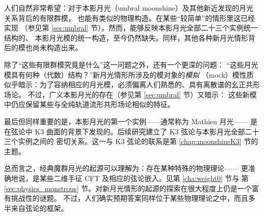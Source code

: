 
人们自然非常希望：对于本影月光（umbral moonshine）及其他新近发现的月光关系背后的有限群模，
也能有类似的物理构造。在某些“较简单”的情形里这已经实现
（参见第 \ref{sec:umbral} 节）。然而，能够反映本影月光全部二十三个实例统一结构的、
本影月光模的统一构造，至今仍然缺失。同样，其他各种新月光情形背后的模也尚未构造出来。


除了“这些有限群模究竟是什么”这一问题之外，还有一个更深的问题：
“这些月光模具有何种（代数）结构？”新月光情形所涉及的模对象的\emph{模拟}
（mock）模性质似乎暗示：为了容纳相应的月光模，必须偏离人们熟悉的、具有离散谱的幺正共形场论。
不过，广义本影月光的存在（参见第 \ref{sec:umbral} 节）又暗示：
这些新模中仍应保留某些与全纯轨道流形共形场论相似的特征。


最后但同样重要的是，本影月光的第一个实例——通常称为 Mathieu 月光——
是在弦论中 K3 曲面的背景下发现的。后续研究建立了 K3 弦论与本影月光全部二十三个实例之间的
密切关系。这一与 K3 弦论的联系是第 \ref{chap:moonshineK3} 节的主题。


总而言之，经典魔群月光的起源可以理解为：存在某种特殊的物理理论——
更准确地说，是某些二维手征 CFT 及相应的弦论嵌入。见第 \ref{cha:weight0} 节与
第 \ref{sec:physics_monstrous} 节。对新月光情形的起源的探索在很大程度上仍是一个富有挑战性的谜题。
不过，人们确实预期答案同样位于某些物理理论之中，而且多半来自弦论的框架。

